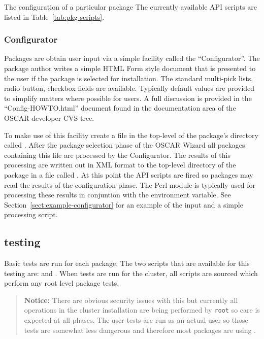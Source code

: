 The configuration of a particular package 
The currently available API scripts are listed in Table~\ref{tab:pkg-scripts}.



\subsubsection{Configurator}
\label{sect:pkg-configurator}

Packages are obtain user input via a simple facility called the
``Configurator''.  The package author writes a simple HTML Form style
document that is presented to the user if the package is selected for
installation.  The standard multi-pick lists, radio button, checkbox fields
are available.  Typically default values are provided to simplify matters
where possible for users.  A full discussion is provided in the ``Config-HOWTO.html'' 
document found in the documentation area of the OSCAR developer CVS tree.

To make use of this facility create a file in the top-level of the
package's directory called .  After the package
selection phase of the OSCAR Wizard all packages containing this file are
processed by the Configurator.  The results of this processing are written
out in XML format to the top-level directory of the package in a file
called .  At this point the
 API scripts are fired so packages may read the
results of the configuration phase.    The Perl  module
is typically used for processing these results in conjuntion with the
 environment variable.  See
Section~\ref{sect:example-configurator} for an example of the input and
a simple processing script.



\subsection{testing}
\label{sect:pkg-testing}

Basic tests are run for each package.  The two scripts that are available
for this testing are:  and .  When tests
are run for the cluster, all  scripts are sourced which
perform any root level package tests.  

\begin{verse}
   {\bfseries Notice: } There are obvious security issues with this
   but currently all operations in the cluster installation are being
   performed by {\tt root} so care is expected at all phases.  The user
   tests are run as an actual user so those tests are somewhat less 
   dangerous and therefore most packages are using .
\end{verse}


